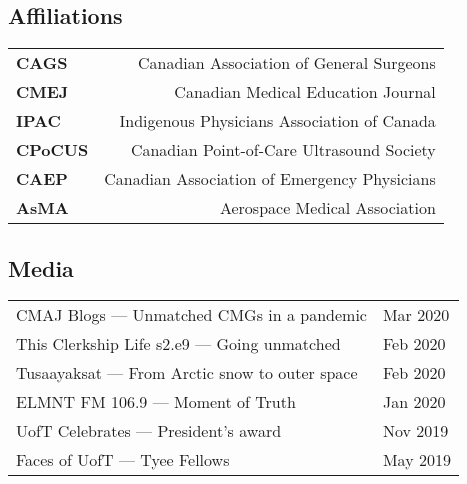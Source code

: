 \documentclass[a4paper,10pt,oneside,onecolumn,draft]{article} %
\begin{document}
\begin{multicols}{2}
\subsection*{Affiliations}
\begin{supertabular}{a@{\SubVRule}D}
  {\bfseries CAGS}&{Canadian Association of General Surgeons}\\%
  {\bfseries CMEJ}&{Canadian Medical Education Journal}\\%
  {\bfseries IPAC}&{Indigenous Physicians Association of Canada}\\
  {\bfseries CPoCUS}&{Canadian Point-of-Care Ultrasound Society}\\
  {\bfseries CAEP}&{Canadian Association of Emergency Physicians}\\
  {\bfseries AsMA}&{Aerospace Medical Association}\\
  \end{supertabular}
  \vfill
  
  \subsection*{Media}
  \begin{supertabular}{E@{\VRule}z}
  {CMAJ Blogs --- }{Unmatched CMGs in a pandemic}&Mar 2020\\%
  {This Clerkship Life s2.e9 --- }{Going unmatched}&Feb 2020\\
  {Tusaayaksat --- From Arctic snow to outer space}&Feb 2020\\
  {ELMNT FM 106.9 --- }{Moment of Truth}&Jan 2020\\
  {UofT Celebrates --- }{President's award}&Nov 2019\\
  {Faces of UofT --- }{Tyee Fellows}&May 2019\\
  \end{supertabular}
\end{multicols}
\end{document}

